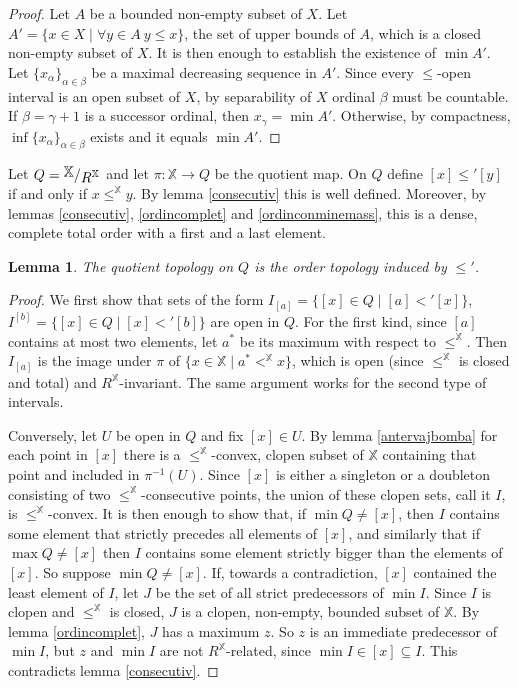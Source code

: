 \documentclass[12pt,twoside,a4paper]{amsart}
\theoremstyle{plain}
\newtheorem{lemma}[theorem]{Lemma}
\theoremstyle{definition}
\begin{document}
\begin{proof}
Let $A$ be a bounded non-empty subset of $X$.
Let $A'=\{ x\in X\mid\forall y\in A\ y\leq x\} $, the set of upper bounds of $A$, which is a closed non-empty subset of $X$.
It is then enough to establish the existence of $\min A'$.
Let $\{ x_{\alpha }\}_{\alpha\in\beta }$ be a maximal decreasing sequence in $A'$.
Since every $\leq $-open interval is an open subset of $X$, by separability of $X$ ordinal $\beta $ must be countable.
If $\beta =\gamma +1$ is a successor ordinal, then $x_{\gamma }=\min A'$.
Otherwise, by compactness, $\inf\{ x_{\alpha }\}_{\alpha\in\beta }$ exists and it equals $\min A'$.
\end{proof}

Let $Q= {{\raisebox{.2em}{${ \mathbb X }\!$}\left/\raisebox{-.2em}{${R^{ \mathbb X }}$}\right.}} $ and let $\pi : \mathbb X \to Q$ be the quotient map.
On $Q$ define $[x]\leq' [y]$ if and only if $x\leq^{ \mathbb X }y$.
By lemma \ref{consecutiv} this is well defined.
Moreover, by lemmas \ref{consecutiv}, \ref{ordincomplet} and \ref{ordinconminemass}, this is a dense, complete total order with a first and a last element.

\begin{lemma} \label{ordertopology}
The quotient topology on $Q$ is the order topology induced by $\leq'$.
\end{lemma}

\begin{proof}
We first show that sets of the form $I_{[a]}=\{ [x]\in Q\mid [a]<'[x]\} $, $I^{[b]}=\{ [x]\in Q\mid [x]<'[b]\} $ are open in $Q$.
For the first kind, since $[a]$ contains at most two elements, let $a^*$ be its maximum with respect to $\leq^{ \mathbb X }$.
Then $I_{[a]}$ is the image under $\pi $ of $\{ x\in \mathbb X \mid a^*<^{ \mathbb X }x\} $, which is open (since $\leq^{ \mathbb X }$ is closed and total) and $R^{ \mathbb X }$-invariant.
The same argument works for the second type of intervals.

Conversely, let $U$ be open in $Q$ and fix $[x]\in U$.
By lemma \ref{antervajbomba} for each point in $[x]$ there is a $\leq^{ \mathbb X }$-convex, clopen subset of $ \mathbb X $ containing that point and included in $\pi^{-1}(U)$.
Since $[x]$ is either a singleton or a doubleton consisting of two $\leq^{ \mathbb X }$-consecutive points, the union of these clopen sets, call it $I$, is $\leq^{ \mathbb X }$-convex.
It is then enough to show that, if $\min Q\neq [x]$, then $I$ contains some element that strictly precedes all elements of $[x]$, and similarly that if $\max Q\neq [x]$ then $I$ contains some element strictly bigger than the elements of $[x]$.
So suppose $\min Q\neq [x]$.
If, towards a contradiction, $[x]$ contained the least element of $I$, let $J$ be the set of all strict predecessors of $\min I$.
Since $I$ is clopen and $\leq^{ \mathbb X }$ is closed, $J$ is a clopen, non-empty, bounded subset of $ \mathbb X $.
By lemma \ref{ordincomplet}, $J$ has a maximum $z$.
So $z$ is an immediate predecessor of $\min I$, but $z$ and $\min I$ are not $R^{ \mathbb X }$-related, since $\min I\in [x]\subseteq I$.
This contradicts lemma \ref{consecutiv}.
\end{proof}
\end{document}
